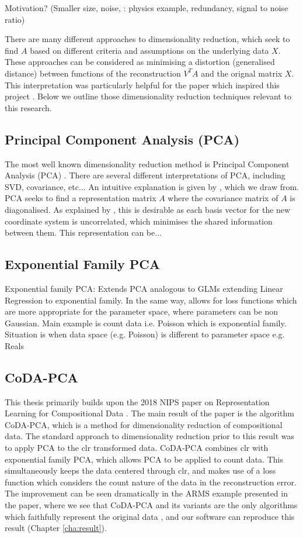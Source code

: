 Motivation? (Smaller size, noise,  \citep{Shlens2005}: physics example, redundancy, signal to noise ratio)

There are many different approaches to dimensionality reduction, which seek to find $A$ based on different criteria and assumptions on the underlying data $X$. These approaches can be considered as minimising a distortion (generalised distance)  between functions of the reconstruction $V^TA$ and the orignal matrix $X$. This interpretation was particularly helpful for the paper which inspired this project \citep{Avalos2018}. Below we outline those dimensionality reduction techniques relevant to this research.    

\subsection{Principal Component Analysis (PCA)}
The most well known dimensionality reduction method is Principal Component Analysis (PCA) \citep{MackiewiczRatajczak1993}. There are several different interpretations of PCA, including SVD, covariance, etc... An intuitive explanation is given by \cite{Shlens2005}, which we draw from. PCA seeks to find a representation matrix $A$ where the covariance matrix of $A$ is diagonalised. As explained by \cite{Shlens2005}, this is desirable as each basis vector for the new coordinate system is uncorrelated, which minimises the shared information between them. This representation can be... 

\subsection{Exponential Family PCA}
Exponential family PCA: Extends PCA analogous to GLMs extending Linear Regression to exponential family. In the same way, allows for loss functions which are more appropriate for the parameter space, where parameters can be non Gaussian. Main example is count data i.e. Poisson which is exponential family. Situation is when data space (e.g. Poisson) is different to parameter space e.g. Reals

\subsection{CoDA-PCA}
\label{codapca}
This thesis primarily builds upon the 2018 NIPS paper on Representation Learning for Compositional Data \citep{Avalos2018}. The main result of the paper is the algorithm CoDA-PCA, which is a method for dimensionality reduction of compositional data. The standard approach to dimensionality reduction prior to this result was to apply PCA to the clr transformed data. CoDA-PCA combines clr with exponential family PCA, which allows PCA to be applied to count data. This simultaneously keeps the data centered through clr, and makes use of a loss function which considers the count nature of the data in the reconstruction error. The improvement can be seen dramatically in the ARMS example presented in the paper, where we see that CoDA-PCA and its variants are the only algorithms which faithfully represent the original data \citep{Avalos2018}, and our software can reproduce this result (Chapter \ref{cha:result}).     



